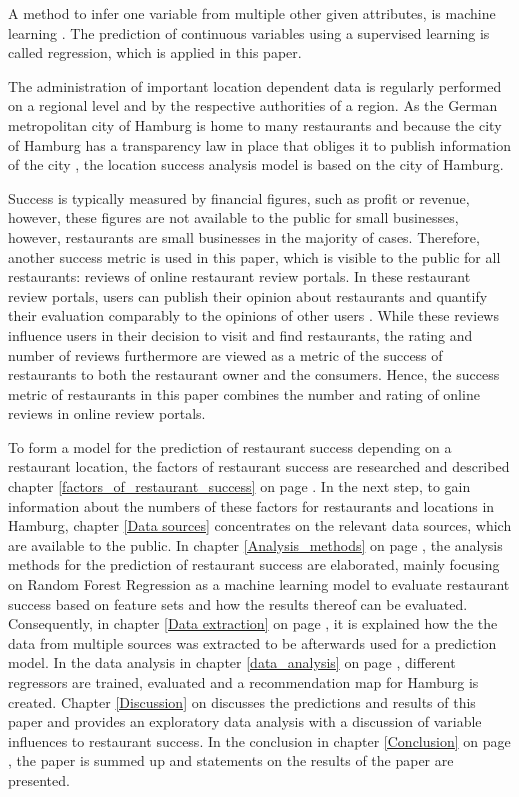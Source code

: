 \documentclass[a4paper, 11pt, oneside]{Thesis}  %
\begin{document}
A method to infer one variable from multiple other given attributes, is machine learning \cite{Friedman.2001}. The prediction of continuous variables using a supervised learning is called regression, which is applied in this paper.

The administration of important location dependent data is regularly performed on a regional level and by the respective authorities of a region. As the German metropolitan city of Hamburg is home to many restaurants and because the city of Hamburg has a transparency law in place that obliges it to publish information of the city \cite{Murjahn.2016}, the location success analysis model is based on the city of Hamburg.

Success is typically measured by financial figures, such as profit or revenue, however, these figures are not available to the public for small businesses, however, restaurants are small businesses in the majority of cases. Therefore, another success metric is used in this paper, which is visible to the public for all restaurants: reviews of online restaurant review portals. In these restaurant review portals, users can publish their opinion about restaurants and quantify their evaluation comparably to the opinions of other users \cite{Mellet.2014}. While these reviews influence users in their decision to visit and find restaurants, the rating and number of reviews furthermore are viewed as a metric of the success of restaurants to both the restaurant owner and the consumers. Hence, the success metric of restaurants in this paper combines the number and rating of online reviews in online review portals.

To form a model for the prediction of restaurant success depending on a restaurant location, the factors of restaurant success are researched and described chapter \ref{factors_of_restaurant_success} on page \pageref{factors_of_restaurant_success}. In the next step, to gain information about the numbers of these factors for restaurants and locations in Hamburg, chapter \ref{Data sources} concentrates on the relevant data sources, which are available to the public. In chapter \ref{Analysis_methods} on page \pageref{Analysis_methods}, the analysis methods for the prediction of restaurant success are elaborated, mainly focusing on Random Forest Regression as a machine learning model to evaluate restaurant success based on feature sets and how the results thereof can be evaluated. Consequently, in chapter \ref{Data extraction} on page \pageref{Data extraction}, it is explained how the the data from multiple sources was extracted to be afterwards used for a prediction model. In the data analysis in chapter \ref{data_analysis} on page \pageref{data_analysis}, different regressors are trained, evaluated and a recommendation map for Hamburg is created. Chapter \ref{Discussion} on \pageref{Discussion} discusses the predictions and results of this paper and provides an exploratory data analysis with a discussion of variable influences to restaurant success. In the conclusion in chapter \ref{Conclusion} on page \pageref{Conclusion}, the paper is summed up and statements on the results of the paper are presented. 
\end{document}

